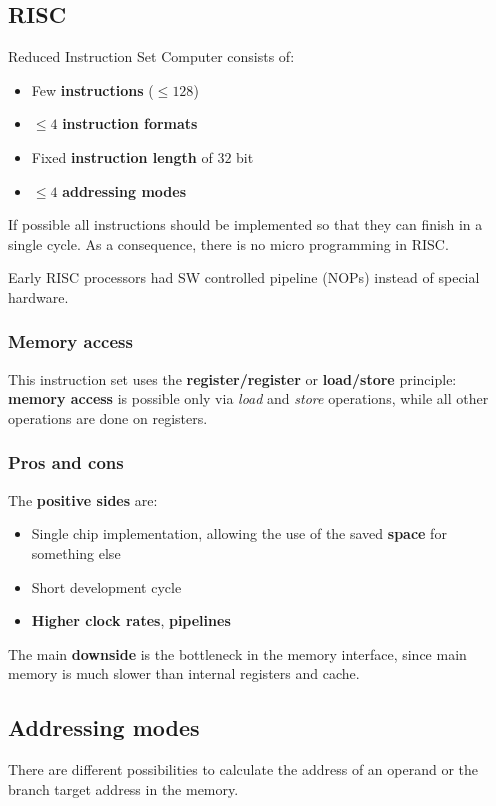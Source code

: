 \subsection{RISC}
Reduced Instruction Set Computer consists of:
\begin{itemize}
	\item Few \textbf{instructions} ($\leq 128$)
	\item $\leq 4$ \textbf{instruction formats}
	\item Fixed \textbf{instruction length} of $32$ bit
	\item $\leq 4$ \textbf{addressing modes}
\end{itemize}
If possible all instructions should be implemented so that they can finish in a single cycle. As a consequence, there is no micro programming in RISC.

\begin{note}
	Early RISC processors had SW controlled pipeline (NOPs) instead of special hardware.
\end{note}
\subsubsection{Memory access}
This instruction set uses the \textbf{register/register} or \textbf{load/store} principle: \textbf{memory access} is possible only via \textit{load} and \textit{store} operations, while all other operations are done on registers.

\subsubsection{Pros and cons}
The \textbf{positive sides} are:
\begin{itemize}
	\item Single chip implementation, allowing the use of the saved \textbf{space} for something else
	\item Short development cycle
	\item \textbf{Higher clock rates}, \textbf{pipelines}
\end{itemize}
The main \textbf{downside} is the bottleneck in the memory interface, since main memory is much slower than internal registers and cache.

\subsection{Addressing modes}
There are different possibilities to calculate the address of an operand or the branch target address in the memory.
